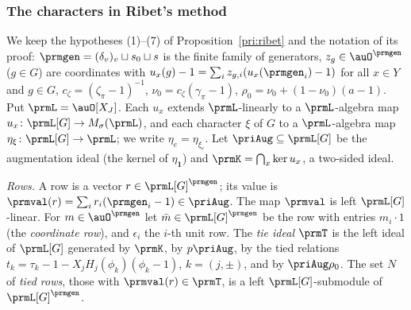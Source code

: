 \documentclass[10pt]{amsart}
\theoremstyle{definition}
\theoremstyle{remark}
\begin{document}
\subsubsection{The characters in Ribet's method}\label{prm:ss-chars}

We keep the hypotheses (1)--(7) of Proposition~\ref{pri:ribet} and the notation of its proof:
$\prmgen=(\delta_v)_v\sqcup s_0\sqcup s$ is the finite family of generators, $z_g\in\auO^{\prmgen}$
($g\in G$) are coordinates with $u_x(g)-1=\sum_iz_{g,i}(u_x(\prmgen_i)-1)$ for all $x\in Y$ and
$g\in G$, $c_\zeta=(\zeta_\pi-1)^{-1}$, $\nu_0=c_\zeta(\gamma_\pi-1)$, $\rho_0=\nu_0+(1-\nu_0)(a-1)$. Put
$\prmL=\auO[X_J]$. Each $u_x$ extends $\prmL$-linearly to a $\prmL$-algebra map $u_x\colon\prmL[G]\to
M_\sigma(\prmL)$, and each character $\xi$ of $G$ to a $\prmL$-algebra map $\eta_\xi\colon\prmL[G]\to
\prmL$; we write $\eta_e=\eta_{\xi_e}$. Let $\priAug\subseteq\prmL[G]$ be the augmentation ideal (the
kernel of $\eta_{\mathbf 1}$) and $\prmK=\bigcap_x\ker u_x$, a two-sided ideal.

\emph{Rows.} A row is a vector $r\in\prmL[G]^{\prmgen}$; its value is $\prmval(r)=\sum_ir_i(\prmgen_i-1)
\in\priAug$. The map $\prmval$ is left $\prmL[G]$-linear. For $m\in\auO^{\prmgen}$ let $\bar m\in
\prmL[G]^{\prmgen}$ be the row with entries $m_i\cdot1$ (the \emph{coordinate row}), and $\epsilon_i$
the $i$-th unit row. The \emph{tie ideal} $\prmT$ is the left ideal of $\prmL[G]$ generated by
$\prmK$, by $p\priAug$, by the tied relations $t_k=\tau_k-1-X_jH_j(\phi_k)(\phi_k-1)$, $k=(j,\pm)$,
and by $\priAug\rho_0$. The set $N$ of \emph{tied rows}, those with $\prmval(r)\in\prmT$, is a left
$\prmL[G]$-submodule of $\prmL[G]^{\prmgen}$.
\end{document}

